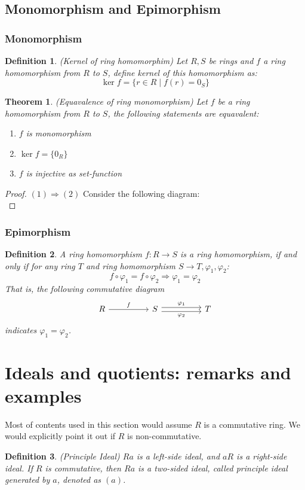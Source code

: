\documentclass[a4paper, pdf, 11.5pt]{article}
\newtheorem{definition}{Definition}
\newtheorem{theorem}{Theorem}
\begin{document}
\subsection{Monomorphism and Epimorphism}
\subsubsection{Monomorphism}
\begin{definition}(Kernel of ring homomorphim)
Let $R, S$ be rings and $f$ a ring homomorphism from $R$ to $S$, define kernel of this homomorphism as:
$$
\ker f=\{r\in R\mid f(r) = 0_{S}\}
$$
\end{definition}
\vspace{0.3cm}
\begin{theorem}(Equavalence of ring monomorphism)
Let $f$ be a ring homomorphism from $R$ to $S$, the following statements are equavalent: 
\begin{enumerate}
  \item  $f$ is monomorphism 
  \item  $\ker f=\{0_{R}\}$
  \item  $f$ is injective as set-function
\end{enumerate}
\end{theorem}
\begin{proof}
  $(1)\Rightarrow(2)$ Consider the following diagram:
  $$
  $$
  
\end{proof}
\subsubsection{Epimorphism}
\vspace{0.3cm}
\begin{definition}
A ring homomorphism $f:R\rightarrow S$ is a ring homomorphism, if and only if for any ring $T$ and ring homomorphism $S\rightarrow T, \varphi_1, \varphi_2$:
$$
f\circ \varphi_1 = f\circ \varphi_2\Longrightarrow \varphi_1 = \varphi_2 
$$
That is, the following commutative diagram
$$
\begin{tikzcd}[column sep=huge]
  R \arrow[r, "f"] & S \arrow[r, "\varphi_1", shift left] \arrow[r, "\varphi_2"', shift right] & T
\end{tikzcd}
$$
indicates $\varphi_1 = \varphi_2$. 
\end{definition}

\section{Ideals and quotients: remarks and examples}
Most of contents used in this section would assume $R$ is a commutative ring. We would explicitly 
point it out if $R$ is non-commutative.
\begin{definition}(Principle Ideal)
  $Ra$ is a left-side ideal, and $aR$ is a right-side ideal. If $R$ is commutative, then $Ra$ 
  is a two-sided ideal, called principle ideal generated by $a$, denoted as $(a)$.
\end{definition}
\end{document}
